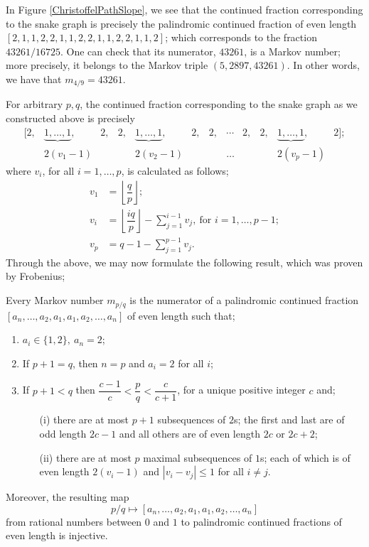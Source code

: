 In Figure \ref{ChristoffelPathSlope}, we see that the continued fraction corresponding to the snake graph is precisely the palindromic continued fraction of even length $[2,1,1,2,2,1,1,2,2,1,1,2,2,1,1,2]$; which corresponds to the fraction $43261/16725$. One can check that its numerator, $43261$, is a Markov number; more precisely, it belongs to the Markov triple $(5,2897,43261)$. In other words, we have that $m_{4/9} = 43261$. 

For arbitrary $p,q$, the continued fraction corresponding to the snake graph as we constructed above is precisely
\begin{equation*}
        \begin{array}{cccccccccccccccccccccccc}
  [2,& \underbrace{1,\dots,1},&  2,& 2,&  \underbrace{1,\dots,1},& 2,& 2, & \cdots & 2,& 2,& \underbrace{1,\dots,1},& 2] ;  \\
 &2(v_1 -1) & & &2(v_2-1)& & &\ldots& & &2(v_p-1) & 
\end{array}
    \end{equation*}
where $v_i$, for all $i = 1,\dots,p$, is calculated as follows;
\begin{align*}
    v_1 &= \left\lfloor \dfrac{q}{p}\right\rfloor; \\
    v_i &= \left\lfloor \dfrac{iq}{p}\right\rfloor - \sum_{j=1}^{i-1}v_j, \ \text{for } i = 1,\dots,p-1; \\
    v_p &= q - 1 - \sum_{j=1}^{p-1} v_j.
\end{align*}
Through the above, we may now formulate the following result, which was proven by Frobenius;
\begin{theorem}\label{MarkovThm}
Every Markov number $m_{p/q}$ is the numerator of a palindromic continued fraction $[a_n,\dots,a_2,a_1,a_1,a_2,\dots,a_n]$ of even length such that;
\begin{enumerate}
    \item $a_i \in \{1,2\}, \ a_n = 2$; 
    \item If $p+1 = q$, then $n = p$ and $a_i = 2$ for all $i$; 
    \item If $p+1 < q$ then $\dfrac{c-1}{c} < \dfrac{p}{q} < \dfrac{c}{c+1}$, for a unique positive integer $c$ and;
    \begin{itemize}
        \item[(i)] there are at most $p+1$ subsequences of $2$s; the first and last are of odd length $2c-1$ and all others are of even length $2c$ or $2c+2$;
        \item[(ii)] there are at most $p$ maximal subsequences of $1$s; each of which is of even length $2(v_i-1)$ and $|v_i - v_j| \leq 1$ for all $i \neq j$.
    \end{itemize}
\end{enumerate}
Moreover, the resulting map
\begin{equation*}
    p/q \mapsto [a_n,\dots,a_2,a_1,a_1,a_2,\dots,a_n]
\end{equation*}
    from rational numbers between $0$ and $1$ to palindromic continued fractions of even length is injective.
\end{theorem}
